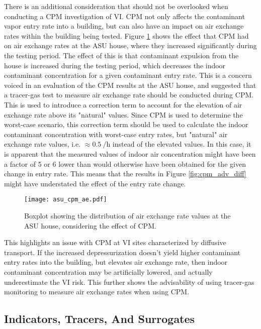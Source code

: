 There is an additional consideration that should not be overlooked when conducting a CPM investigation of VI.
CPM not only affects the contaminant vapor entry rate into a building, but can also have an impact on air exchange rates within the building being tested.
Figure \ref{fig:asu_cpm_ae} shows the effect that CPM had on air exchange rates at the ASU house, where they increased significantly during the testing period.
The effect of this is that contaminant expulsion from the house is increased during the testing period, which decreases the indoor contaminant concentration for a given contaminant entry rate.
This is a concern voiced in \cite{holton_long-term_2015}\cite{holton_long-term_2015} an evaluation of the CPM results at the ASU house, and suggested that a tracer-gas test to measure air exchange rate should be conducted during CPM.
This is used to introduce a correction term to account for the elevation of air exchange rate above its "natural" values.
Since CPM is used to determine the worst-case scenario, this correction term should be used to calculate the indoor contaminant concentration with worst-case entry rates, but "natural" air exchange rate values, i.e. $\approx \SI{0.5}{\per\hour}$ instead of the elevated values.
In this case, it is apparent that the measured values of indoor air concentration might have been a factor of 5 or 6 lower than would otherwise have been obtained for the given change in entry rate.
This means that the results in Figure \ref{fig:cpm_adv_diff} might have understated the effect of the entry rate change. \par

\begin{figure}[htb!]
  \centering
  \texttt{[image: asu\_cpm\_ae.pdf]}
  \caption{Boxplot showing the distribution of air exchange rate values at the ASU house, considering the effect of CPM.}
  \label{fig:asu_cpm_ae}
\end{figure}

This highlights an issue with CPM at VI sites characterized by diffusive transport.
If the increased depressurization doesn't yield higher contaminant entry rates into the building, but elevates air exchange rate, then indoor contaminant concentration may be artificially lowered, and actually underestimate the VI risk.
This further shows the advisability of using tracer-gas monitoring to measure air exchange rates when using CPM.\par

\subsection{Indicators, Tracers, And Surrogates}

